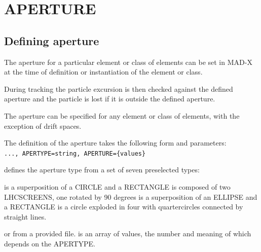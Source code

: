  
\chapter{APERTURE}
\label{chap:aperture}

\section{Defining aperture}
\label{sec:def_aper}
The aperture for a particular element or class of elements can be set in MAD-X 
at the time of definition or instantiation of the element or class.

During tracking the particle excursion is then checked against the defined aperture and 
the particle is lost if it is outside the defined aperture.

The aperture can be specified for any element or class of elements, 
with the exception of drift spaces. 

The definition of the aperture takes the following form and parameters:\\
{\tt ..., APERTYPE=string,  APERTURE=\{values\}}


\begin{madlist}
   defines the aperture type from a set of seven
  preselected types:
    \begin{madlist}
       is a superposition of a CIRCLE and
        a RECTANGLE 
       is composed of two LHCSCREENS, one rotated by 90
        degrees  
       is a superposition of an ELLIPSE and a
        RECTANGLE
       is a circle exploded in four with
      quartercircles connected by straight lines.  
    \end{madlist}
    or from a provided file.
   is an array of values, the number and meaning 
of which depends on the APERTYPE.  
\end{madlist}

